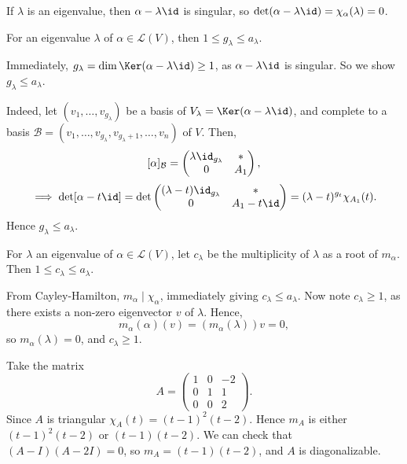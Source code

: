 \documentclass[12pt]{article}
\begin{document}
\begin{remark}
	If $\lambda$ is an eigenvalue, then $\alpha - \lambda \id$ is singular, so $\det(\alpha - \lambda \id) = \chi_{\alpha}(\lambda) = 0$.
\end{remark}

\begin{lemma}
	For an eigenvalue $\lambda$ of $\alpha \in \mathcal{L}(V)$, then $1 \leq g_{\lambda} \leq a_{\lambda}$.
\end{lemma}

\begin{proofbox}
	Immediately, $g_{\lambda} = \dim \Ker(\alpha - \lambda \id) \geq 1$, as $\alpha - \lambda \id$ is singular. So we show $g_{\lambda} \leq a_{\lambda}$.

	Indeed, let $(v_1, \ldots, v_{g_{\lambda}})$ be a basis of $V_{\lambda} = \Ker(\alpha - \lambda \id)$, and complete to a basis $\mathcal{B} = (v_1, \ldots, v_{g_{\lambda}}, v_{g_{\lambda} + 1}, \ldots, v_n)$ of $V$. Then,
	\[
		[\alpha]_{\mathcal{B}} =
		\begin{pmatrix}
			\lambda \id_{g_{\lambda}} & \ast \\
			0 & A_1
		\end{pmatrix}
	,\]
	\[
		\implies \det[\alpha - t \id] = \det
		\begin{pmatrix}
			(\lambda - t) \id_{g_{\lambda}} & \ast \\
			0 & A_1 - t \id
		\end{pmatrix}
		= (\lambda - t)^{g_t} \chi_{A_1}(t)
	.\]
	Hence $g_{\lambda} \leq a_{\lambda}$.
\end{proofbox}

\begin{lemma}
	For $\lambda$ an eigenvalue of $\alpha \in \mathcal{L}(V)$, let $c_{\lambda}$ be the multiplicity of $\lambda$ as a root of $m_{\alpha}$. Then $1 \leq c_{\lambda} \leq a_{\lambda}$.
\end{lemma}

\begin{proofbox}
	From Cayley-Hamilton, $m_{\alpha} \mid \chi_{\alpha}$, immediately giving $c_{\lambda} \leq a_{\lambda}$. Now note $c_{\lambda} \geq 1$, as there exists a non-zero eigenvector $v$ of $\lambda$. Hence,
	\[
		m_{\alpha}(\alpha)(v) = (m_{\alpha}(\lambda))v = 0
	,\]
	so $m_{\alpha}(\lambda) = 0$, and $c_{\lambda} \geq 1$.
\end{proofbox}

\begin{exbox}
	Take the matrix
	\[
	A =
	\begin{pmatrix}
		1 & 0 & -2 \\
		0 & 1 & 1 \\
		0 & 0 & 2
	\end{pmatrix}
	.\]
	Since $A$ is triangular $\chi_{A}(t) = (t - 1)^2(t - 2)$. Hence $m_{A}$ is either $(t - 1)^2(t - 2)$ or $(t - 1)(t - 2)$. We can check that $(A - I)(A - 2I) = 0$, so $m_{A} = (t - 1)(t - 2)$, and $A$ is diagonalizable.
\end{exbox}
\end{document}

